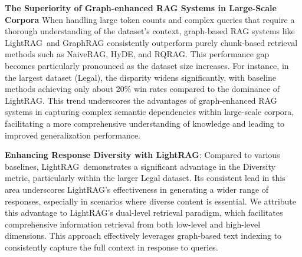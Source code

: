 \documentclass{article} %
\def\model{LightRAG}
\begin{document}
\textbf{The Superiority of Graph-enhanced RAG Systems in Large-Scale Corpora}
When handling large token counts and complex queries that require a thorough understanding of the dataset's context, graph-based RAG systems like \model\ and GraphRAG consistently outperform purely chunk-based retrieval methods such as NaiveRAG, HyDE, and RQRAG. This performance gap becomes particularly pronounced as the dataset size increases. For instance, in the largest dataset (Legal), the disparity widens significantly, with baseline methods achieving only about 20\% win rates compared to the dominance of \model. This trend underscores the advantages of graph-enhanced RAG systems in capturing complex semantic dependencies within large-scale corpora, facilitating a more comprehensive understanding of knowledge and leading to improved generalization performance.

\textbf{Enhancing Response Diversity with \model}:
Compared to various baselines, \model\ demonstrates a significant advantage in the Diversity metric, particularly within the larger Legal dataset. Its consistent lead in this area underscores \model's effectiveness in generating a wider range of responses, especially in scenarios where diverse content is essential. We attribute this advantage to \model's dual-level retrieval paradigm, which facilitates comprehensive information retrieval from both low-level and high-level dimensions. This approach effectively leverages graph-based text indexing to consistently capture the full context in response to queries.
\end{document}
